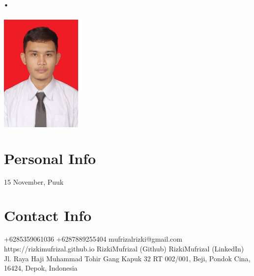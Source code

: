 \documentclass[english]{cv-style}
\begin{document}

\begin{aside}
\section{.}
\includegraphics[width=4cm]{foto}
%
\section{Personal Info}
15 November, Puuk
%
\section{Contact Info}
+6285359061036
+6287889255404
mufrizalrizki@gmail.com
https://rizkimufrizal.github.io
RizkiMufrizal (Github)
RizkiMufrizal (LinkedIn)
~
Jl. Raya Haji Muhammad Tohir Gang Kapuk 32 RT 002/001, Beji, Pondok Cina, 16424, Depok, Indonesia
%
\end{aside}
\end{document}
